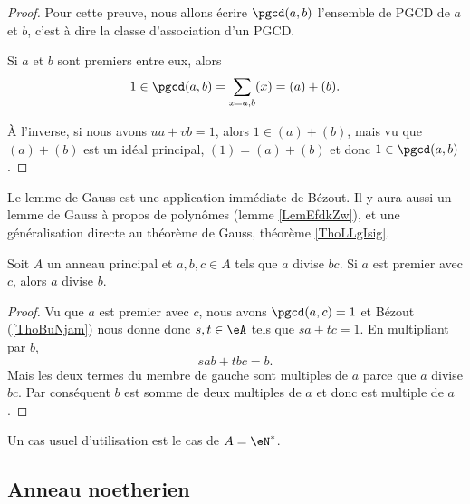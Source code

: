 \begin{proof}
    Pour cette preuve, nous allons écrire \( \pgcd(a,b)\) l'ensemble de PGCD de \( a\) et \( b\), c'est à dire la classe d'association d'un PGCD.

    Si \( a\) et \( b\) sont premiers entre eux, alors
    \begin{equation}
        1\in\pgcd(a,b)=\sum_{x=a,b}(x)=(a)+(b).
    \end{equation}
    
    À l'inverse, si nous avons \( ua+vb=1\), alors \( 1\in (a)+(b)\), mais vu que \( (a)+(b)\) est un idéal principal, \( (1)=(a)+(b)\) et donc \( 1\in \pgcd(a,b)\).
\end{proof}

Le lemme de Gauss est une application immédiate de Bézout. Il y aura aussi un lemme de Gauss à propos de polynômes (lemme \ref{LemEfdkZw}), et une généralisation directe au théorème de Gauss, théorème \ref{ThoLLgIsig}.
\begin{lemma}    \label{LemSdnZNX}
    Soit \( A\) un anneau principal et \( a,b,c\in A\) tels que \( a\) divise \( bc\). Si \( a\) est premier avec \( c\), alors \( a\) divise \( b\).
\end{lemma}

\begin{proof}
    Vu que \( a\) est premier avec \( c\), nous avons \( \pgcd(a,c)=1\) et Bézout (\ref{ThoBuNjam}) nous donne donc \( s,t\in \eA\) tels que \( sa+tc=1\). En multipliant par \( b\),
    \begin{equation}
        sab+tbc=b.
    \end{equation}
    Mais les deux termes du membre de gauche sont multiples de \( a\) parce que \( a\) divise \( bc\). Par conséquent \( b\) est somme de deux multiples de \( a\) et donc est multiple de \( a\).
\end{proof}
Un cas usuel d'utilisation est le cas de \( A=\eN^*\).

\subsection{Anneau noetherien}

